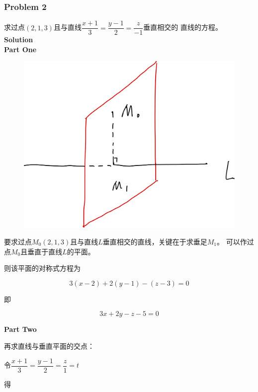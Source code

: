 \documentclass[12pt, a4paper]{article}
\numberwithin{equation}{section}
\begin{document}
\subsubsection{Problem 2}

    求过点\(\left(2,1,3\right)\)且与直线$\dfrac{x+1}{3}=\dfrac{y-1}{2}=\dfrac{z}{-1}$垂直相交的
    直线的方程。
    \\

    \textbf{Solution}
    \\

    \textbf{Part One}

    \begin{figure}
        \centering
        \includegraphics[scale=0.08]{"Chapter 08 images/pic1.png"}
        \label{pic1}
    \end{figure}

    要求过点\(M_{0}\left(2,1,3\right)\)且与直线$L$垂直相交的直线，关键在于求垂足\(M_1\)。
    可以作过点\(M_{0}\)且垂直于直线$L$的平面。

    则该平面的对称式方程为

    \[
        3(x-2)+2(y-1)-(z-3)=0
    \]

    即

    \[
        3x + 2y -z -5 =0
    \]

    \textbf{Part Two}

    再求直线与垂直平面的交点：

    令$\dfrac{x+1}{3}=\dfrac{y-1}{2}=\dfrac{z}{1}=t$

    得
\end{document}

